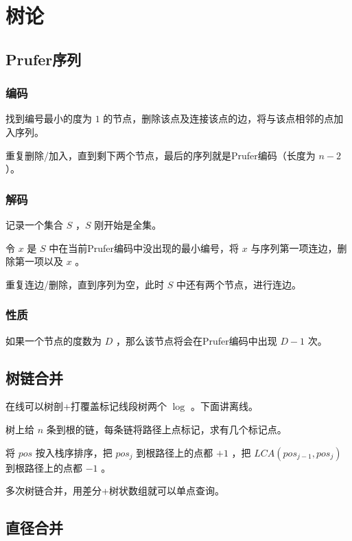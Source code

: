 \section{树论}

\subsection{Prufer序列}

\subsubsection*{编码}

找到编号最小的度为 $1$ 的节点，删除该点及连接该点的边，将与该点相邻的点加入序列。

重复删除/加入，直到剩下两个节点，最后的序列就是Prufer编码（长度为 $n-2$ ）。

\subsubsection*{解码}

记录一个集合 $S$ ，$S$ 刚开始是全集。

令 $x$ 是 $S$ 中在当前Prufer编码中没出现的最小编号，将 $x$ 与序列第一项连边，删除第一项以及 $x$ 。

重复连边/删除，直到序列为空，此时 $S$ 中还有两个节点，进行连边。

\subsubsection*{性质}

如果一个节点的度数为 $D$ ，那么该节点将会在Prufer编码中出现 $D-1$ 次。

\subsection{树链合并}

在线可以树剖+打覆盖标记线段树两个 $\log$ 。下面讲离线。

树上给 $n$ 条到根的链，每条链将路径上点标记，求有几个标记点。

将 $pos$ 按入栈序排序，把 $pos_j$ 到根路径上的点都 $+1$ ，把 $LCA(pos_{j-1},pos_j)$ 到根路径上的点都 $-1$ 。

多次树链合并，用差分+树状数组就可以单点查询。



\subsection{直径合并}

